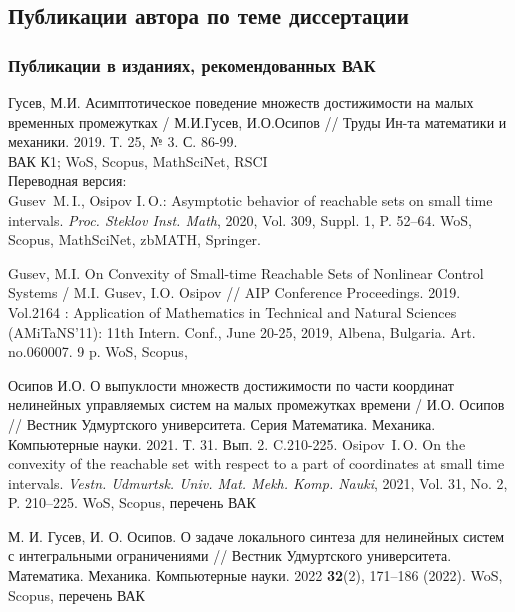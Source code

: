 \documentclass[../main.tex]{subfiles}
\begin{document}
\clearpage
\begin{thebibliography}{99}
    \subsection*{Публикации автора по теме диссертации}
    \subsubsection*{Публикации в изданиях, рекомендованных ВАК}
    Гусев, М.И. 
    Асимптотическое поведение множеств достижимости на малых временных промежутках / 
    М.И.Гусев, И.О.Осипов // 
    Труды Ин-та математики и механики. 
    2019. Т. 25, № 3. С. 86-99. 
     \\
    ВАК К1; WoS, Scopus, MathSciNet, RSCI
    \\ Переводная версия: \\
    Gusev~M.\,I., Osipov I.\,O.: Asymptotic behavior of reachable sets on small time intervals. \emph{Proc. Steklov Inst. Math}, 2020, Vol. 309, Suppl. 1, P. 52--64.  
    WoS, Scopus, MathSciNet, zbMATH, Springer.
    
    Gusev, M.I. 
    On Convexity of Small-time Reachable Sets of Nonlinear Control Systems / 
    M.I. Gusev, I.O. Osipov // 
    AIP Conference Proceedings. 
    2019. 
    Vol.2164 : 
    Application of Mathematics in Technical and Natural Sciences (AMiTaNS’11): 
    11th Intern. Conf., 
    June 20-25, 2019, Albena, Bulgaria. 
    Art. no.060007. 9 p.
    WoS, Scopus,
    
    Осипов И.О. 
    О выпуклости множеств достижимости по части координат нелинейных управляемых систем на малых промежутках времени / 
    И.О. Осипов // 
    Вестник Удмуртского университета. Серия Математика. Механика. Компьютерные науки. 
    2021. Т. 31. Вып. 2. C.210-225.
    Osipov~I.\,O. On the convexity of the reachable set with respect to a part of coordinates at small time intervals. 
    \emph{Vestn. Udmurtsk. Univ. Mat. Mekh. Komp. Nauki}, 2021,  Vol. 31, No. 2, P. 210--225.
     WoS, Scopus, перечень ВАК
     
     М. И. Гусев, И. О. Осипов.
     О задаче локального синтеза для нелинейных систем с интегральными ограничениями // 
     Вестник Удмуртского университета. Математика. Механика. Компьютерные науки. 2022
     \textbf{32}(2), 171–186 (2022).
      WoS, Scopus, перечень ВАК
     

\end{thebibliography}
\end{document}

